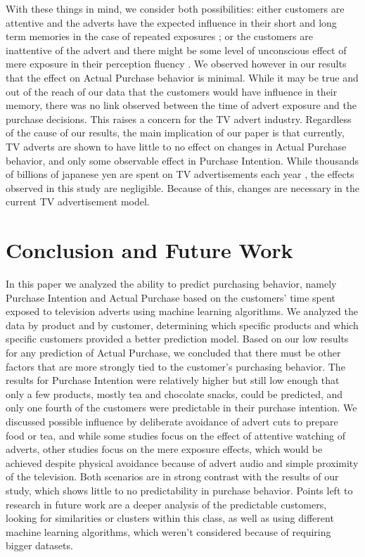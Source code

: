 \documentclass[review]{elsarticle}
\begin{document}
With these things in mind, we consider both possibilities: either customers are attentive and the adverts have the expected influence in their short and long term memories in the case of repeated exposures \cite{23}; or the customers are inattentive of the advert and there might be some level of unconscious effect of mere exposure in their perception fluency \cite{14}. We observed however in our results that the effect on Actual Purchase behavior is minimal. While it may be true and out of the reach of our data that the customers would have influence in their memory, there was no link observed between the time of advert exposure and the purchase decisions. This raises a concern for the TV advert industry. Regardless of the cause of our results, the main implication of our paper is that currently, TV adverts are shown to have little to no effect on changes in Actual Purchase behavior, and only some observable effect in Purchase Intention. While thousands of billions of japanese yen are spent on TV advertisements each year \cite{42}, the effects observed in this study are negligible. Because of this, changes are necessary in the current TV advertisement model.

\section{Conclusion and Future Work}
\label{conclusion}

In this paper we analyzed the ability to predict purchasing behavior, namely Purchase Intention and Actual Purchase based on the customers' time spent exposed to television adverts using machine learning algorithms. We analyzed the data by product and by customer, determining which specific products and which specific customers provided a better prediction model. Based on our low results for any prediction of Actual Purchase, we concluded that there must be other factors that are more strongly tied to the customer's purchasing behavior. The results for Purchase Intention were relatively higher but still low enough that only a few products, mostly tea and chocolate snacks, could be predicted, and only one fourth of the customers were predictable in their purchase intention. We discussed possible influence by deliberate avoidance of advert cuts to prepare food or tea, and while some studies focus on the effect of attentive watching of adverts, other studies focus on the mere exposure effects, which would be achieved despite physical avoidance because of advert audio and simple proximity of the television. Both scenarios are in strong contrast with the results of our study, which shows little to no predictability in purchase behavior. Points left to research in future work are a deeper analysis of the predictable customers, looking for similarities or clusters within this class, as well as using different machine learning algorithms, which weren't considered because of requiring bigger datasets.
\end{document}
